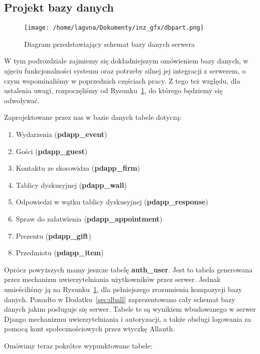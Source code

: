 \documentclass[12pt,titlepage]{article}
\begin{document}
\subsection{Projekt bazy danych}

\begin{figure}[htb]
\begin{center}
 \texttt{[image: /home/lagvna/Dokumenty/inz\_gfx/dbpart.png]}
 \caption{Diagram przedstawiający schemat bazy danych serwera}
 \label{fig:dbpart}
\end{center}
\end{figure}
\newpage
W tym podrozdziale zajmiemy się dokładniejszym omówieniem bazy danych, w ujęciu funkcjonalności systemu oraz potrzeby silnej jej integracji z serwerem, o czym wspominaliśmy w poprzednich częściach
pracy. Z tego też względu, dla ustalenia uwagi, rozpoczęliśmy od Rysunku~\ref{fig:dbpart}, do którego będziemy się odwoływać.

Zaprojektowane przez nas w bazie danych tabele dotyczą:

\begin{enumerate}
 \item Wydarzenia (\textbf{pdapp\_event})
 \item Gości (\textbf{pdapp\_guest})
 \item Kontaktu ze skorowidza (\textbf{pdapp\_firm})
 \item Tablicy dyskusyjnej (\textbf{pdapp\_wall})
 \item Odpowiedzi w wątku tablicy dyskusyjnej (\textbf{pdapp\_response})
 \item Spraw do załatwienia (\textbf{pdapp\_appointment})
 \item Prezentu (\textbf{pdapp\_gift})
 \item Przedmiotu (\textbf{pdapp\_item})
\end{enumerate}

Oprócz powyższych mamy jeszcze tabelę \textbf{auth\_user}. Jest to tabela generowana przez mechanizm uwierzytelniania użytkowników przez serwer. Jednak umieściliśmy ją na Rysunku~\ref{fig:dbpart}, dla pełniejszego
zrozumienia kompozycji bazy danych.
Ponadto w Dodatku~\ref{sec:dball} zaprezentowano cały schemat bazy danych jakim posługuje się serwer. Tabele te są wynikiem wbudowanego w serwer Django mechanizmu uwierzytelniania i autoryzacji, a także
obsługi logowania za pomocą kont społecznościowych przez wtyczkę Allauth.

Omówimy teraz pokrótce wypunktowane tabele:
\end{document}
